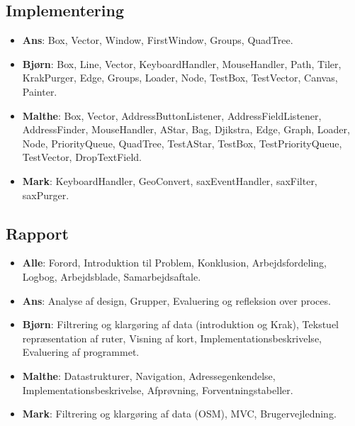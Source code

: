 \subsection{Implementering}

\begin{itemize}
	\item \textbf{Ans}: Box, Vector, Window, FirstWindow, Groups, QuadTree.
	\item \textbf{Bjørn}: Box, Line, Vector, KeyboardHandler, MouseHandler, Path, Tiler, KrakPurger, Edge, Groups, Loader, Node, TestBox, TestVector, Canvas, Painter.
	\item \textbf{Malthe}: Box, Vector, AddressButtonListener, AddressFieldListener, AddressFinder, MouseHandler, AStar, Bag, Djikstra, Edge, Graph, Loader, Node, PriorityQueue, QuadTree, TestAStar, TestBox, TestPriorityQueue, TestVector, DropTextField.
	\item \textbf{Mark}: KeyboardHandler, GeoConvert, saxEventHandler, saxFilter, saxPurger.
\end{itemize}

\subsection{Rapport}

\begin{itemize}
	\item \textbf{Alle}: Forord, Introduktion til Problem, Konklusion, Arbejdsfordeling, Logbog, Arbejdsblade, Samarbejdsaftale.
	\item \textbf{Ans}: Analyse af design, Grupper, Evaluering og refleksion over proces.
	\item \textbf{Bjørn}: Filtrering og klargøring af data (introduktion og Krak), Tekstuel repræsentation af ruter, Visning af kort, Implementationsbeskrivelse, Evaluering af programmet.
	\item \textbf{Malthe}: Datastrukturer, Navigation, Adressegenkendelse, Implementationsbeskrivelse, Afprøvning, Forventningstabeller.
	\item \textbf{Mark}: Filtrering og klargøring af data (OSM), MVC, Brugervejledning.
\end{itemize}